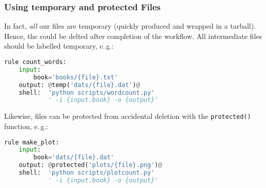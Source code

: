 \begin{frame}[fragile]
  \frametitle{Using temporary and protected Files}
  In fact, \emph{all} our files are temporary (quickly produced and wrapped in a tarball). Hence, the could be delted after completion of the workflow. All intermediate files should be labelled temporary, e.\,g.:
  \begin{lstlisting}[language=Python,style=Python,basicstyle=\tiny]
rule count_words:
    input:
        book='books/{file}.txt'
    output: @temp('dats/{file}.dat')@
    shell:  'python scripts/wordcount.py'
            ' -i {input.book} -o {output}'
  \end{lstlisting}
  \pause
  Likewise, files can be protected from accidental deletion with the \texttt{protected()} function, e.\,g.:
  \begin{lstlisting}[language=Python,style=Python,basicstyle=\tiny]
rule make_plot:
    input:
        book='dats/{file}.dat'
    output: @protected('plots/{file}.png')@
    shell:  'python scripts/plotcount.py'
            ' -i {input.book} -o {output}'
  \end{lstlisting}
\end{frame}




